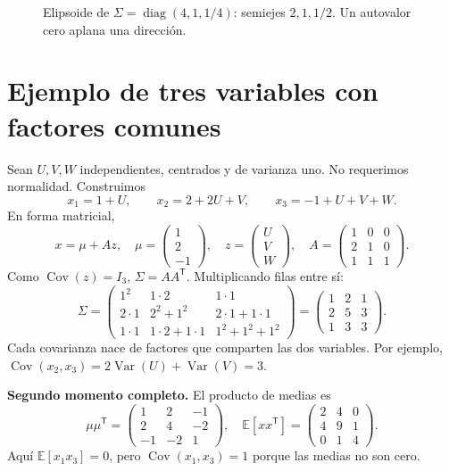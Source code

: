 \documentclass[11pt,a4paper]{article}
\newcommand{\E}{\mathbb E}
\newcommand{\T}{^{\mathsf T}}
\DeclareMathOperator{\Var}{Var}
\DeclareMathOperator{\Cov}{Cov}
\DeclareMathOperator{\diag}{diag}
\newcommand{\topic}[2]{\clearpage\section{#1}\label{#2}}
\theoremstyle{definition}\newtheorem{definicion}[teorema]{Definición}
\begin{document}
\begin{figure}[H]\centering
{}
\caption{Elipsoide de $\Sigma=\diag(4,1,1/4)$: semiejes $2,1,1/2$. Un autovalor cero aplana una dirección.}
\end{figure}
\topic{Ejemplo de tres variables con factores comunes}{s14}
Sean $U,V,W$ independientes, centrados y de varianza uno. No requerimos
normalidad. Construimos
\[
x_1=1+U,\qquad x_2=2+2U+V,\qquad
x_3=-1+U+V+W.
\]
En forma matricial,
\[
x=\mu+Az,\quad
\mu=\begin{pmatrix}1\\2\\-1\end{pmatrix},\quad
z=\begin{pmatrix}U\\V\\W\end{pmatrix},\quad
A=\begin{pmatrix}1&0&0\\2&1&0\\1&1&1\end{pmatrix}.
\]
Como $\Cov(z)=I_3$, $\Sigma=AA\T$. Multiplicando filas entre sí:
\[
\Sigma=
\begin{pmatrix}
1^2&1\cdot2&1\cdot1\\
2\cdot1&2^2+1^2&2\cdot1+1\cdot1\\
1\cdot1&1\cdot2+1\cdot1&1^2+1^2+1^2
\end{pmatrix}
=\begin{pmatrix}1&2&1\\2&5&3\\1&3&3\end{pmatrix}.
\]
Cada covarianza nace de factores que comparten las dos variables.
Por ejemplo, $\Cov(x_2,x_3)=2\Var(U)+\Var(V)=3$.

\textbf{Segundo momento completo.} El producto de medias es
\[
\mu\mu\T=\begin{pmatrix}1&2&-1\\2&4&-2\\-1&-2&1\end{pmatrix},
\quad
\E[xx\T]=\begin{pmatrix}2&4&0\\4&9&1\\0&1&4\end{pmatrix}.
\]
Aquí $\E[x_1x_3]=0$, pero $\Cov(x_1,x_3)=1$ porque las medias no son cero.
\end{document}
